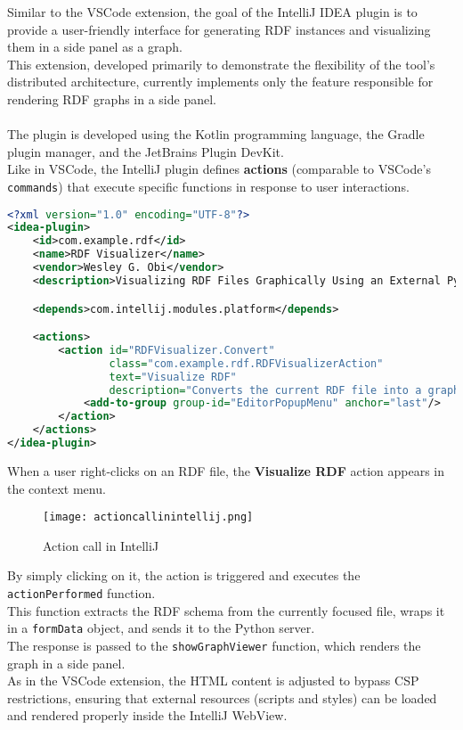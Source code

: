 Similar to the VSCode extension, the goal of the IntelliJ IDEA plugin is to provide a user-friendly interface for generating RDF instances and visualizing them in a side panel as a graph.
\\
This extension, developed primarily to demonstrate the flexibility of the tool’s distributed architecture, currently implements only the feature responsible for rendering RDF graphs in a side panel.
\\
\\
The plugin is developed using the Kotlin programming language, the Gradle plugin manager, and the JetBrains Plugin DevKit.
\\
Like in VSCode, the IntelliJ plugin defines \textbf{actions} (comparable to VSCode’s \texttt{commands}) that execute specific functions in response to user interactions.

\begin{lstlisting}[caption={IntelliJ Actions}, label={lst:actions}, language=xml]
<?xml version="1.0" encoding="UTF-8"?>
<idea-plugin>
    <id>com.example.rdf</id>
    <name>RDF Visualizer</name>
    <vendor>Wesley G. Obi</vendor>
    <description>Visualizing RDF Files Graphically Using an External Python Service</description>

    <depends>com.intellij.modules.platform</depends>

    <actions>
        <action id="RDFVisualizer.Convert"
                class="com.example.rdf.RDFVisualizerAction"
                text="Visualize RDF"
                description="Converts the current RDF file into a graphical visualization">
            <add-to-group group-id="EditorPopupMenu" anchor="last"/>
        </action>
    </actions>
</idea-plugin>
\end{lstlisting}

When a user right-clicks on an RDF file, the \textbf{Visualize RDF} action appears in the context menu.

\begin{figure}[htb]
    \centering
    \texttt{[image: actioncallinintellij.png]}
    \caption{Action call in IntelliJ}
    \label{fig:actioncallinintellija}
\end{figure}

By simply clicking on it, the action is triggered and executes the \texttt{actionPerformed} function.
\\
This function extracts the RDF schema from the currently focused file, wraps it in a \texttt{formData} object, and sends it to the Python server.
\\
The response is passed to the \texttt{showGraphViewer} function, which renders the graph in a side panel.
\\
As in the VSCode extension, the HTML content is adjusted to bypass CSP restrictions, ensuring that external resources (scripts and styles) can be loaded and rendered properly inside the IntelliJ WebView.

